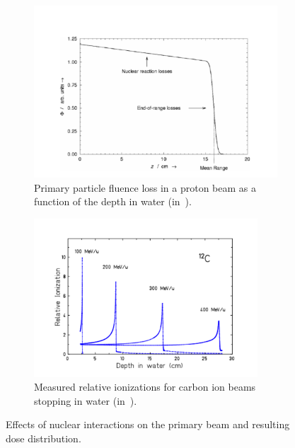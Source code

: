 \begin{figure}
\begin{subfigure}[t]{.5\textwidth}
\centering
\includegraphics[width=1.\textwidth]{03_GraphicFiles/chapter1_Introduction/primaryLoss.pdf}
\caption{Primary particle fluence loss in a proton beam as a function of the depth in water (in~\cite{Newhauser2015}).}
\label{chap1::fig::nuclearReacLoss}
\end{subfigure}
\begin{subfigure}[t]{.5\textwidth}
\centering
\includegraphics[width=0.92\textwidth]{03_GraphicFiles/chapter1_Introduction/tailBragg.pdf}	
\caption{Measured relative ionizations for carbon ion beams stopping in water (in~\cite{Schardt2008}).}
\label{chap1::fig::TailBragg}
\end{subfigure}
\caption{Effects of nuclear interactions on the primary beam and resulting dose distribution.}
\label{chap1::fig::}
\end{figure}

